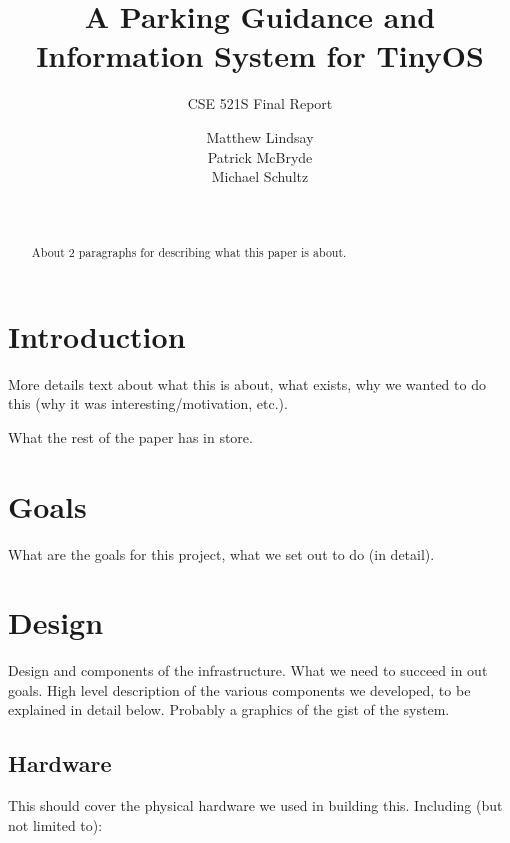 \documentclass{acm_proc}
\begin{document}
\title{A Parking Guidance and Information System for TinyOS}
\subtitle{CSE 521S Final Report}

\author{
\alignauthor Matthew Lindsay\\
\alignauthor Patrick McBryde\\
\alignauthor Michael Schultz\\
\and
{}\\
}

\maketitle

\begin{abstract}
About 2 paragraphs for describing what this paper is about.
\end{abstract}

\section{Introduction}

More details text about what this is about, what exists, why we wanted to
do this (why it was interesting/motivation, etc.).

What the rest of the paper has in store.

\section{Goals}\label{sec:goals}

What are the goals for this project, what we set out to do (in detail).

\section{Design}\label{sec:design}

Design and components of the infrastructure.  What we need to succeed in
out goals.
High level description of the various components we developed, to be
explained in detail below.
Probably a graphics of the gist of the system.

\subsection{Hardware}

This should cover the physical hardware we used in building this.
Including (but not limited to):
\end{document}
